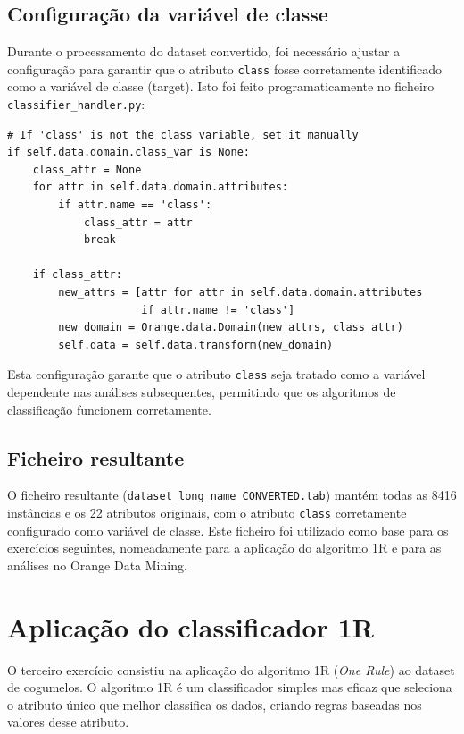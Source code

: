 \documentclass[12pt,a4paper]{article}
\begin{document}
\subsection{Configuração da variável de classe}

Durante o processamento do dataset convertido, foi necessário ajustar a configuração para garantir que o atributo \texttt{class} fosse corretamente identificado como a variável de classe (target). Isto foi feito programaticamente no ficheiro \texttt{classifier\_handler.py}:

\begin{verbatim}
# If 'class' is not the class variable, set it manually
if self.data.domain.class_var is None:
    class_attr = None
    for attr in self.data.domain.attributes:
        if attr.name == 'class':
            class_attr = attr
            break
    
    if class_attr:
        new_attrs = [attr for attr in self.data.domain.attributes 
                     if attr.name != 'class']
        new_domain = Orange.data.Domain(new_attrs, class_attr)
        self.data = self.data.transform(new_domain)
\end{verbatim}

Esta configuração garante que o atributo \texttt{class} seja tratado como a variável dependente nas análises subsequentes, permitindo que os algoritmos de classificação funcionem corretamente.

\subsection{Ficheiro resultante}

O ficheiro resultante (\texttt{dataset\_long\_name\_CONVERTED.tab}) mantém todas as 8416 instâncias e os 22 atributos originais, com o atributo \texttt{class} corretamente configurado como variável de classe. Este ficheiro foi utilizado como base para os exercícios seguintes, nomeadamente para a aplicação do algoritmo 1R e para as análises no Orange Data Mining.

\section{Aplicação do classificador 1R}

O terceiro exercício consistiu na aplicação do algoritmo 1R (\textit{One Rule}) ao dataset de cogumelos. O algoritmo 1R é um classificador simples mas eficaz que seleciona o atributo único que melhor classifica os dados, criando regras baseadas nos valores desse atributo.
\end{document}
